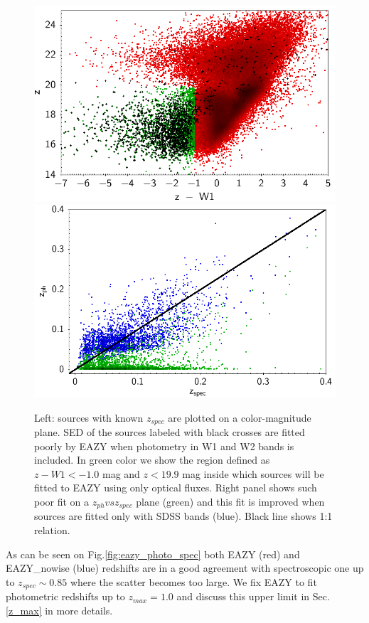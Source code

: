 \documentclass[apj,iop]{emulateapj}
\begin{document}
\begin{figure}[!ht]
\includegraphics[width=0.5\linewidth]{figures/zw1_outl_color1.png}
\includegraphics[width=0.5\linewidth]{figures/zw1_outl_photoz_spec_z.png}
\caption{Left: sources with known $z_{spec}$ are plotted on a color-magnitude plane. SED of the sources labeled with black crosses are fitted poorly by EAZY when photometry in W1 and W2 bands is included. In green color we show the region defined as $z-W1<-1.0$ mag and $z<19.9$ mag inside which sources will be fitted to EAZY using only optical fluxes. Right panel shows such poor fit on a $z_{ph} vs z_{spec}$ plane (green) and this fit is improved when sources are fitted only with SDSS bands (blue). Black line shows 1:1 relation.}
\label{fig:zw1}
\end{figure}

As can be seen on Fig.\ref{fig:eazy_photo_spec} both EAZY (red) and EAZY\_nowise (blue) redshifts are in a good agreement with spectroscopic one up to $z_{spec}\sim 0.85$ where the scatter becomes too large. We fix EAZY to fit photometric redshifts up to $z_{max}=1.0$ and discuss this upper limit in Sec. \ref{z_max} in more details.


\end{document}
